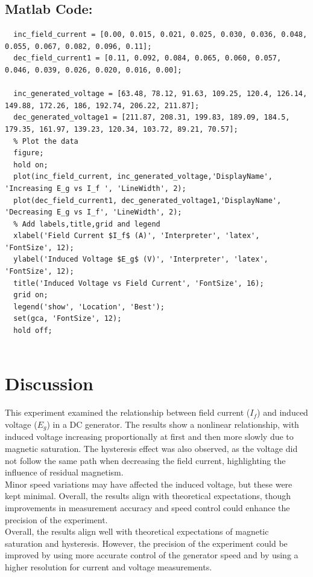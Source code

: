 \documentclass[a4paper,12pt]{article}
\begin{document}
\subsection{Matlab Code:}

\begin{lstlisting}[style=vscode-light, caption={MATLAB code for plotting data}]
  % Given data
  inc_field_current = [0.00, 0.015, 0.021, 0.025, 0.030, 0.036, 0.048, 0.055, 0.067, 0.082, 0.096, 0.11];
  dec_field_current1 = [0.11, 0.092, 0.084, 0.065, 0.060, 0.057, 0.046, 0.039, 0.026, 0.020, 0.016, 0.00];
  
  inc_generated_voltage = [63.48, 78.12, 91.63, 109.25, 120.4, 126.14, 149.88, 172.26, 186, 192.74, 206.22, 211.87];
  dec_generated_voltage1 = [211.87, 208.31, 199.83, 189.09, 184.5, 179.35, 161.97, 139.23, 120.34, 103.72, 89.21, 70.57];
  % Plot the data
  figure;
  hold on;
  plot(inc_field_current, inc_generated_voltage,'DisplayName', 'Increasing E_g vs I_f ', 'LineWidth', 2);
  plot(dec_field_current1, dec_generated_voltage1,'DisplayName', 'Decreasing E_g vs I_f', 'LineWidth', 2);
  % Add labels,title,grid and legend 
  xlabel('Field Current $I_f$ (A)', 'Interpreter', 'latex', 'FontSize', 12);
  ylabel('Induced Voltage $E_g$ (V)', 'Interpreter', 'latex', 'FontSize', 12);
  title('Induced Voltage vs Field Current', 'FontSize', 16);
  grid on;
  legend('show', 'Location', 'Best');
  set(gca, 'FontSize', 12);
  hold off;
  
\end{lstlisting}

\section{Discussion}

This experiment examined the relationship between field current ($I_f$) and induced voltage ($E_g$) in a DC generator. The results show a nonlinear relationship, with induced voltage increasing proportionally at first and then more slowly due to magnetic saturation. The hysteresis effect was also observed, as the voltage did not follow the same path when decreasing the field current, highlighting the influence of residual magnetism.\\

Minor speed variations may have affected the induced voltage, but these were kept minimal. Overall, the results align with theoretical expectations, though improvements in measurement accuracy and speed control could enhance the precision of the experiment.\\

Overall, the results align well with theoretical expectations of magnetic saturation and hysteresis. However, the precision of the experiment could be improved by using more accurate control of the generator speed and by using a higher resolution for current and voltage measurements. 
\end{document}
